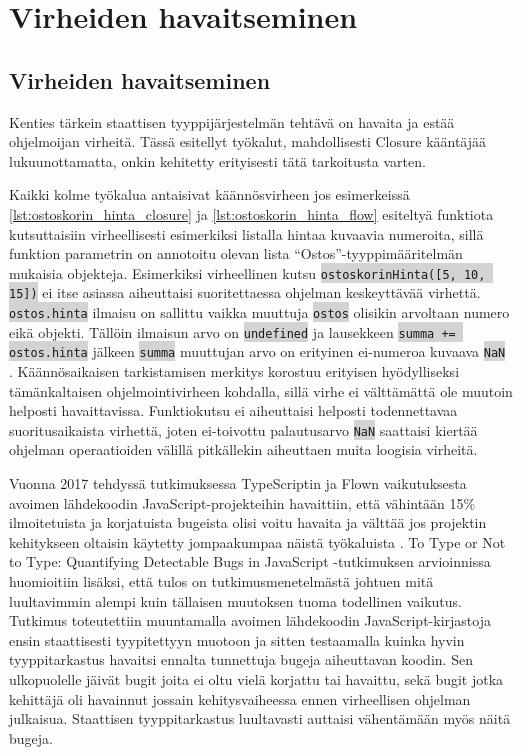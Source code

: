 \chapter{Virheiden havaitseminen}

\section{Virheiden havaitseminen}

Kenties tärkein staattisen tyyppijärjestelmän tehtävä on havaita ja estää
ohjelmoijan virheitä. Tässä esitellyt työkalut, mahdollisesti Closure
kääntäjää lukuunottamatta, onkin kehitetty erityisesti tätä tarkoitusta
varten.

Kaikki kolme työkalua antaisivat käännösvirheen jos esimerkeissä
\ref{lst:ostoskorin_hinta_closure} ja \ref{lst:ostoskorin_hinta_flow}
esiteltyä funktiota kutsuttaisiin virheellisesti esimerkiksi listalla
hintaa kuvaavia numeroita, sillä funktion parametrin on annotoitu olevan
lista ``Ostos''-tyyppimääritelmän mukaisia objekteja. Esimerkiksi
virheellinen kutsu
\colorbox{lightgray}{\lstinline|ostoskorinHinta([5, 10, 15])|} ei itse
asiassa aiheuttaisi suoritettaessa ohjelman keskeyttävää virhettä.
\colorbox{lightgray}{\lstinline|ostos.hinta|} ilmaisu on sallittu vaikka
muuttuja \colorbox{lightgray}{\lstinline|ostos|} olisikin arvoltaan numero
eikä objekti. Tällöin ilmaisun arvo on \colorbox{lightgray}{\lstinline|undefined|}
ja lausekkeen \colorbox{lightgray}{\lstinline|summa += ostos.hinta|} jälkeen
\colorbox{lightgray}{\lstinline|summa|} muuttujan arvo on erityinen
ei-numeroa kuvaava \colorbox{lightgray}{\lstinline|NaN|} \cite{Ecma262NaN}.
Käännösaikaisen tarkistamisen merkitys korostuu erityisen hyödylliseksi
tämänkaltaisen ohjelmointivirheen kohdalla, sillä virhe ei välttämättä ole
muutoin helposti havaittavissa. Funktiokutsu ei aiheuttaisi helposti
todennettavaa suoritusaikaista virhettä, joten ei-toivottu palautusarvo
\colorbox{lightgray}{\lstinline|NaN|} saattaisi kiertää ohjelman
operaatioiden välillä pitkällekin aiheuttaen muita loogisia virheitä.

Vuonna 2017 tehdyssä tutkimuksessa TypeScriptin ja Flown vaikutuksesta avoimen
lähdekoodin JavaScript-projekteihin havaittiin, että vähintään 15\%
ilmoitetuista ja korjatuista bugeista olisi voitu havaita ja välttää jos
projektin kehitykseen oltaisin käytetty jompaakumpaa näistä työkaluista \cite{ToTypeOrNotToType}.
To Type or Not to Type: Quantifying Detectable Bugs in JavaScript -tutkimuksen
arvioinnissa huomioitiin lisäksi, että tulos on tutkimusmenetelmästä
johtuen mitä luultavimmin alempi kuin tällaisen muutoksen tuoma todellinen
vaikutus. Tutkimus toteutettiin muuntamalla avoimen lähdekoodin
JavaScript-kirjastoja ensin staattisesti tyypitettyyn muotoon ja sitten
testaamalla kuinka hyvin tyyppitarkastus havaitsi ennalta tunnettuja bugeja
aiheuttavan koodin. Sen ulkopuolelle jäivät bugit joita ei oltu vielä
korjattu tai havaittu, sekä bugit jotka kehittäjä oli havainnut jossain
kehitysvaiheessa ennen virheellisen ohjelman julkaisua. Staattisen
tyyppitarkastus luultavasti auttaisi vähentämään myös näitä bugeja.

